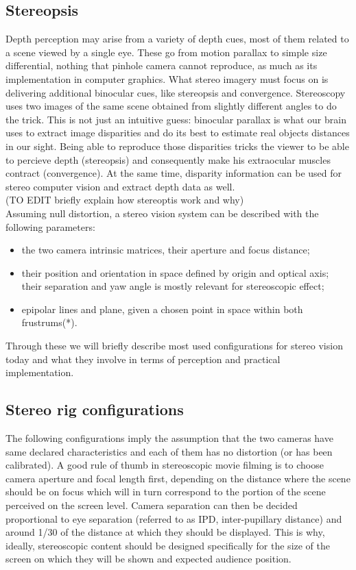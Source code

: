 \subsection{Stereopsis}
Depth perception may arise from a variety of depth cues, most of them related to a scene viewed by a single eye. These go from motion parallax to simple size differential, nothing that pinhole camera cannot reproduce, as much as its implementation in computer graphics. What stereo imagery must focus on is delivering additional binocular cues, like stereopsis and convergence. Stereoscopy uses two images of the same scene obtained from slightly different angles to do the trick. This is not just an intuitive guess: binocular parallax is what our brain uses to extract image disparities and do its best to estimate real objects distances in our sight. Being able to reproduce those disparities tricks the viewer to be able to percieve depth (stereopsis) and consequently make his extraocular muscles contract (convergence). At the same time, disparity information can be used for stereo computer vision and extract depth data as well.\\
(TO EDIT briefly explain how stereoptis work and why)\\
Assuming null distortion, a stereo vision system can be described with the following parameters:
\begin{itemize}
\item the two camera intrinsic matrices, their aperture and focus distance;
\item their position and orientation in space defined by origin and optical axis; their separation and yaw angle is mostly relevant for stereoscopic effect;
\item epipolar lines and plane, given a chosen point in space within both frustrums(*).
\end{itemize}
Through these we will briefly describe most used configurations for stereo vision today and what they involve in terms of perception and practical implementation.

\subsection{Stereo rig configurations}
The following configurations imply the assumption that the two cameras have same declared characteristics and each of them has no distortion (or has been calibrated). A good rule of thumb in stereoscopic movie filming is to choose camera aperture and focal length first, depending on the distance where the scene should be on focus which will in turn correspond to the portion of the scene perceived on the screen level. Camera separation can then be decided proportional to eye separation (referred to as IPD, inter-pupillary distance) and around 1/30 of the distance at which they should be displayed. This is why, ideally, stereoscopic content should be designed specifically for the size of the screen on which they will be shown and expected audience position.

